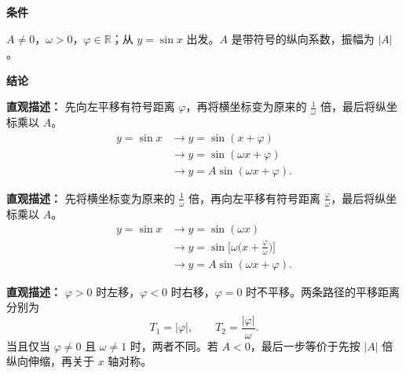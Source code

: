 \begin{statementbox}
	\textbf{\textcolor{CStatement}{条件}}
	\begin{description}[style=nextline, leftmargin=2.8em, labelsep=0.5em, itemsep=0.35em]
		\item[\textbf{\textcolor{CStatement}{参数条件：}}] $A\neq 0$，$\omega>0$，$\varphi\in\mathbb R$；从 $y=\sin x$ 出发。$A$ 是带符号的纵向系数，振幅为 $|A|$。
	\end{description}

	\textbf{\textcolor{CStatement}{结论}}
	\begin{description}[style=nextline, leftmargin=2.8em, labelsep=0.5em, itemsep=0.45em]
		\item[\textbf{\textcolor{CStatement}{结论一（先移后缩）：}}]
			\textbf{\textcolor{CStatement}{直观描述：}}
			先向左平移有符号距离 $\varphi$，再将横坐标变为原来的 $\frac{1}{\omega}$ 倍，最后将纵坐标乘以 $A$。
			\[
				\begin{aligned}
					y=\sin x &\to y=\sin(x+\varphi) \\
					&\to y=\sin(\omega x+\varphi) \\
					&\to y=A\sin(\omega x+\varphi).
			\end{aligned}
			\]

		\item[\textbf{\textcolor{CStatement}{结论二（先缩后移）：}}]
			\textbf{\textcolor{CStatement}{直观描述：}}
			先将横坐标变为原来的 $\frac{1}{\omega}$ 倍，再向左平移有符号距离 $\frac{\varphi}{\omega}$，最后将纵坐标乘以 $A$。
			\[
				\begin{aligned}
					y=\sin x &\to y=\sin(\omega x) \\
					&\to y=\sin\!\Big[\omega\Big(x+\frac{\varphi}{\omega}\Big)\Big] \\
					&\to y=A\sin(\omega x+\varphi).
			\end{aligned}
			\]

		\item[\textbf{\textcolor{CStatement}{平移量与方向：}}]
			\textbf{\textcolor{CStatement}{直观描述：}}
			$\varphi>0$ 时左移，$\varphi<0$ 时右移，$\varphi=0$ 时不平移。两条路径的平移距离分别为
			\[
				T_1 = |\varphi|,
				\qquad
				T_2 = \frac{|\varphi|}{\omega}.
			\]
			当且仅当 $\varphi\neq0$ 且 $\omega\neq1$ 时，两者不同。若 $A<0$，最后一步等价于先按 $|A|$ 倍纵向伸缩，再关于 $x$ 轴对称。
	\end{description}
\end{statementbox}
